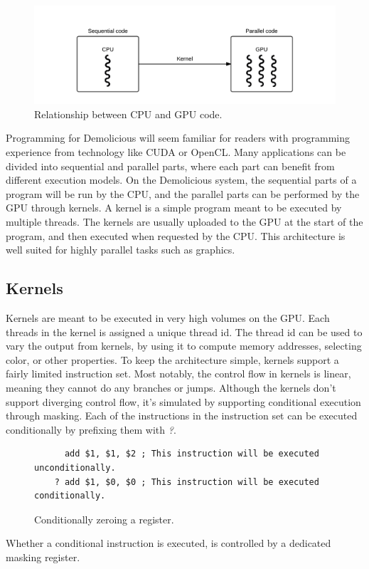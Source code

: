 \begin{figure}[H]
	\centering
	\includegraphics[width=\textwidth]{system_overview/diagrams/programming_model_cpu_gpu.png}
	\caption{Relationship between CPU and GPU code.}
	\label{fig:programming_model_cpu_gpu}
\end{figure}
Programming for Demolicious will seem familiar for readers with programming experience from technology like CUDA or OpenCL. 
Many applications can be divided into sequential and parallel parts, where each part can benefit from different execution models. 
On the Demolicious system, the sequential parts of a program will be run by the CPU, and the parallel parts can be performed by the GPU through kernels.
A kernel is a simple program meant to be executed by multiple threads.
The kernels are usually uploaded to the GPU at the start of the program, and then executed when requested by the CPU.
This architecture is well suited for highly parallel tasks such as graphics.

\subsection{Kernels}
Kernels are meant to be executed in very high volumes on the GPU.
Each threads in the kernel is assigned a unique thread id.
The thread id can be used to vary the output from kernels, 
by using it to compute memory addresses, selecting color, or other properties.
To keep the architecture simple, kernels support a fairly limited instruction set.
Most notably, the control flow in kernels is linear, meaning they cannot do any branches or jumps.
Although the kernels don't support diverging control flow,
it's simulated by supporting conditional execution through masking.
Each of the instructions in the instruction set can be executed conditionally by prefixing them with \textit{?}.

\begin{figure}[H]
	\centering
	\begin{verbatim}
	  add $1, $1, $2 ; This instruction will be executed unconditionally.
	? add $1, $0, $0 ; This instruction will be executed conditionally.
	\end{verbatim}
	\caption{Conditionally zeroing a register.}
	\label{fig:conditional_execution}
\end{figure}
Whether a conditional instruction is executed, is controlled by a dedicated masking register. 

